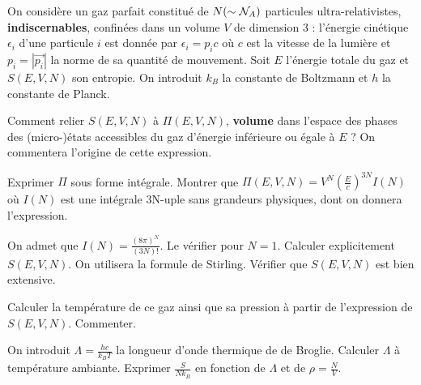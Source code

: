 On considère un gaz parfait constitué de $N (\sim {\cal N}_A)$ particules ultra-relativistes, {\bf indiscernables}, confinées dans un volume $V$ de dimension 3 : l'énergie cinétique $\epsilon_i$ d'une particule $i$ est donnée par $\epsilon_i= p_ic$ où $c$ est la vitesse de la lumière et $p_i=|\Vec{p_i}|$ la norme de sa quantité de mouvement. Soit $E$ l'énergie totale du gaz et $S(E,V,N)$ son entropie. On introduit $k_B$ la constante de Boltzmann et $h$ la constante de Planck.

\medskip

\question Comment relier $S(E,V,N)$ à $\Pi(E,V,N)$, {\bf volume} dans l'espace des phases des (micro-)états accessibles du gaz d'énergie inférieure ou égale à $E$ ? On commentera l'origine de cette expression.

\question Exprimer $\Pi$ sous forme intégrale. Montrer que $\Pi(E,V,N)=V^N (\frac{E}{c})^{3N} I(N)$ où $I(N)$ est une intégrale 3N-uple sans grandeurs physiques, dont on donnera l'expression.

\question On admet que $I(N)=\frac{(8 \pi)^N}{(3N)!}$. Le vérifier pour $N=1$. Calculer explicitement $S(E,V,N)$. On utilisera la formule de Stirling. Vérifier que $S(E,V,N)$ est bien extensive.

\question Calculer la température de ce gaz ainsi que sa pression à partir de l'expression de $S(E,V,N)$. Commenter.

\question On introduit $\Lambda=\frac{hc}{k_BT}$ la longueur d'onde thermique de de Broglie. Calculer $\Lambda$ à température ambiante. Exprimer $\frac{S}{N k_B}$ en fonction de $\Lambda$ et de $\rho=\frac{N}{V}$.  
